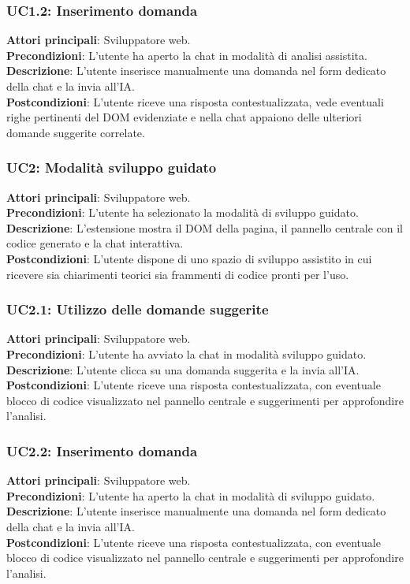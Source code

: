 \subsubsection*{UC1.2: Inserimento domanda}
\noindent \textbf{Attori principali}: Sviluppatore web.\\
\textbf{Precondizioni}: L’utente ha aperto la chat in modalità di analisi assistita.\\
\textbf{Descrizione}: L’utente inserisce manualmente una domanda nel form dedicato della chat e la invia all'IA.\\
\textbf{Postcondizioni}: L’utente riceve una risposta contestualizzata, vede eventuali righe pertinenti del DOM evidenziate e nella chat appaiono delle ulteriori domande suggerite correlate.


\subsubsection*{UC2: Modalità sviluppo guidato}
\noindent \textbf{Attori principali}: Sviluppatore web.\\
\textbf{Precondizioni}: L’utente ha selezionato la modalità di sviluppo guidato.\\
\textbf{Descrizione}: L’estensione mostra il DOM della pagina, il pannello centrale con il codice generato e la chat interattiva. \\
\textbf{Postcondizioni}: L’utente dispone di uno spazio di sviluppo assistito in cui ricevere sia chiarimenti teorici sia frammenti di codice pronti per l’uso.\\

\subsubsection*{UC2.1: Utilizzo delle domande suggerite}
\noindent \textbf{Attori principali}: Sviluppatore web.\\
\textbf{Precondizioni}: L’utente ha avviato la chat in modalità sviluppo guidato.\\
\textbf{Descrizione}: L’utente clicca su una domanda suggerita e la invia all'IA.\\
\textbf{Postcondizioni}: L’utente riceve una risposta contestualizzata, con eventuale blocco di codice visualizzato nel pannello centrale e suggerimenti per approfondire l’analisi.\\

\subsubsection*{UC2.2: Inserimento domanda}
\noindent \textbf{Attori principali}: Sviluppatore web.\\
\textbf{Precondizioni}: L’utente ha aperto la chat in modalità di sviluppo guidato.\\
\textbf{Descrizione}: L’utente inserisce manualmente una domanda nel form dedicato della chat e la invia all'IA.\\
\textbf{Postcondizioni}: L’utente riceve una risposta contestualizzata, con eventuale blocco di codice visualizzato nel pannello centrale e suggerimenti per approfondire l’analisi.

